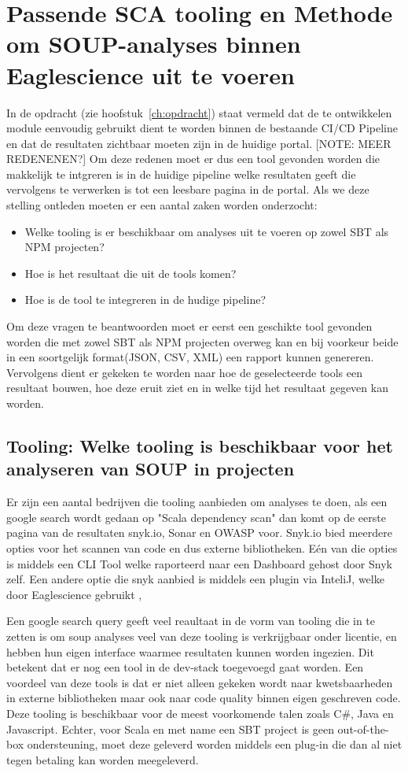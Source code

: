 \section{Passende SCA tooling en Methode om SOUP-analyses binnen Eaglescience uit te voeren}\label{sec:sca-tooling}
In de opdracht (zie hoofstuk~\ref{ch:opdracht}) staat vermeld dat de te ontwikkelen module eenvoudig gebruikt dient te worden binnen de bestaande CI/CD Pipeline en dat de resultaten zichtbaar moeten zijn in de huidige portal. [NOTE: MEER REDENENEN?] Om deze redenen moet er dus een tool gevonden worden die makkelijk te intgreren is in de huidige pipeline welke resultaten geeft die vervolgens te verwerken is tot een leesbare pagina in de portal. Als we deze stelling ontleden moeten er een aantal zaken worden onderzocht:
\begin{itemize}
    \item Welke tooling is er beschikbaar om analyses uit te voeren op zowel SBT als NPM projecten?
    \item Hoe is het resultaat die uit de tools komen?
    \item Hoe is de tool te integreren in de hudige pipeline?
\end{itemize}
Om deze vragen te beantwoorden moet er eerst een geschikte tool gevonden worden die met zowel SBT als NPM projecten overweg kan en bij voorkeur beide in een soortgelijk format(JSON, CSV, XML) een rapport kunnen genereren. Vervolgens dient er gekeken te worden naar hoe de geselecteerde tools een resultaat bouwen, hoe deze eruit ziet en in welke tijd het resultaat gegeven kan worden.

\subsection{Tooling: Welke tooling is beschikbaar voor het analyseren van SOUP in projecten}\label{subsec:ESTooling}
Er zijn een aantal bedrijven die tooling aanbieden om analyses te doen, als een google search wordt gedaan op "Scala dependency scan" dan komt op de eerste pagina van de resultaten snyk.io, Sonar en OWASP voor. Snyk.io bied meerdere opties voor het scannen van code en dus externe bibliotheken. Eén van die opties is middels een CLI Tool welke raporteerd naar een Dashboard gehost door Snyk zelf. Een andere optie die snyk aanbied is middels een plugin via InteliJ, welke door Eaglescience gebruikt ,

Een google search query geeft veel reaultaat in de vorm van tooling die in te zetten is om soup analyses veel van deze tooling is verkrijgbaar onder licentie, en hebben hun eigen interface waarmee resultaten kunnen worden ingezien. Dit betekent dat er nog een tool in de dev-stack toegevoegd gaat worden. Een voordeel van deze tools is dat er niet alleen gekeken wordt naar kwetsbaarheden in externe bibliotheken maar ook naar code quality binnen eigen geschreven code. Deze tooling is beschikbaar voor de meest voorkomende talen zoals C#, Java en Javascript. Echter, voor Scala en met name een SBT project is geen out-of-the-box ondersteuning, moet deze geleverd worden middels een plug-in die dan al niet tegen betaling kan worden meegeleverd.

